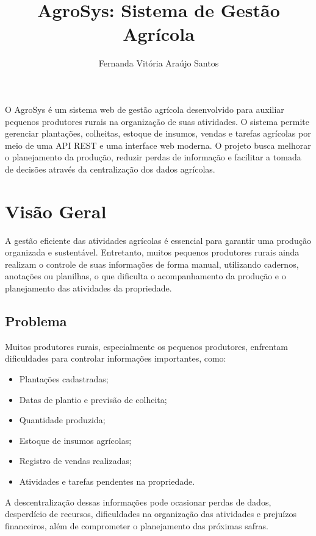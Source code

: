 \documentclass[12pt]{article}
\title{AgroSys: Sistema de Gestão Agrícola}
\author{Fernanda Vitória Araújo Santos}
\begin{document}
\maketitle


\begin{resumo}
  O AgroSys é um sistema web de gestão agrícola desenvolvido para auxiliar pequenos produtores rurais na organização de suas atividades. O sistema permite gerenciar plantações, colheitas, estoque de insumos, vendas e tarefas agrícolas por meio de uma API REST e uma interface web moderna. O projeto busca melhorar o planejamento da produção, reduzir perdas de informação e facilitar a tomada de decisões através da centralização dos dados agrícolas.
\end{resumo}


\section{Visão Geral}

A gestão eficiente das atividades agrícolas é essencial para garantir uma produção organizada e sustentável. Entretanto, muitos pequenos produtores rurais ainda realizam o controle de suas informações de forma manual, utilizando cadernos, anotações ou planilhas, o que dificulta o acompanhamento da produção e o planejamento das atividades da propriedade.

\subsection{Problema}

Muitos produtores rurais, especialmente os pequenos produtores, enfrentam dificuldades para controlar informações importantes, como:

\begin{itemize}
  \item Plantações cadastradas;
  \item Datas de plantio e previsão de colheita;
  \item Quantidade produzida;
  \item Estoque de insumos agrícolas;
  \item Registro de vendas realizadas;
  \item Atividades e tarefas pendentes na propriedade.
\end{itemize}

A descentralização dessas informações pode ocasionar perdas de dados, desperdício de recursos, dificuldades na organização das atividades e prejuízos financeiros, além de comprometer o planejamento das próximas safras.
\end{document}
